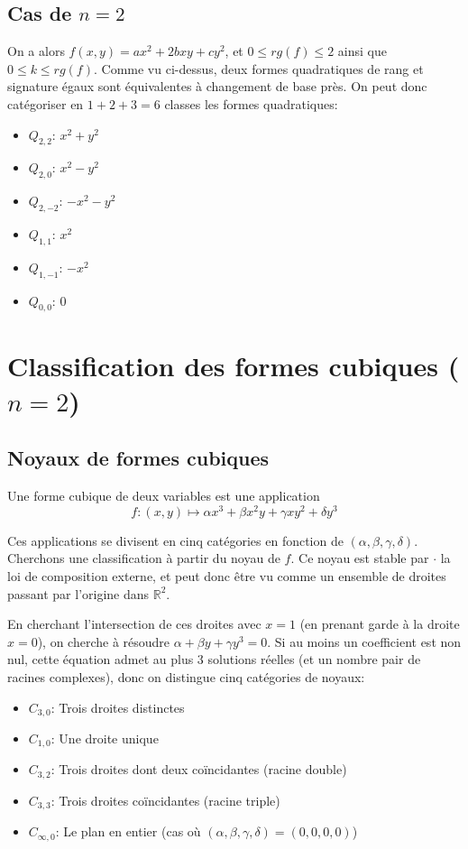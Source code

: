 \documentclass[a4paper]{article}
\begin{document}
\subsection{Cas de $n=2$}

On a alors $f(x,y)=ax^2+2bxy+cy^2$, et $0\leq rg(f)\leq 2$ ainsi que $0\leq k\leq rg(f)$. Comme vu ci-dessus, deux formes quadratiques de rang et signature égaux sont équivalentes à changement de base près. On peut donc catégoriser en $1+2+3=6$ classes les formes quadratiques:


\begin{itemize}
\item  $Q_{2,2}$: $x^2+y^2$
\item  $Q_{2,0}$: $x^2-y^2$
\item  $Q_{2,-2}$: $-x^2-y^2$
\item  $Q_{1,1}$: $x^2$
\item  $Q_{1,-1}$: $-x^2$
\item  $Q_{0,0}$: $0$

\end{itemize}

\section{Classification des formes cubiques ($n=2$)}

\subsection{Noyaux de formes cubiques}

Une forme cubique de deux variables est une application $$f: (x,y) \mapsto \alpha x^3+\beta x^2y+\gamma xy^2+\delta y^3$$

Ces applications se divisent en cinq catégories en fonction de $(\alpha,\beta,\gamma,\delta)$. Cherchons une classification à partir du noyau de $f$. Ce noyau est stable par $\cdot$ la loi de composition externe, et peut donc être vu comme un ensemble de droites passant par l'origine dans $\mathbb{R}^2$.

En cherchant l'intersection de ces droites avec $x=1$ (en prenant garde à la droite $x=0$), on cherche à résoudre $\alpha+\beta y+\gamma y^3=0$. Si au moins un coefficient est non nul, cette équation admet au plus 3 solutions réelles (et un nombre pair de racines complexes), donc on distingue cinq catégories de noyaux:


\begin{itemize}
\item  $C_{3,0}$: Trois droites distinctes
\item  $C_{1,0}$: Une droite unique
\item  $C_{3,2}$: Trois droites dont deux coïncidantes (racine double)
\item  $C_{3,3}$: Trois droites coïncidantes (racine triple)
\item  $C_{\infty,0}$: Le plan en entier (cas où $(\alpha,\beta,\gamma,\delta)=(0,0,0,0)$)

\end{itemize}
\end{document}
